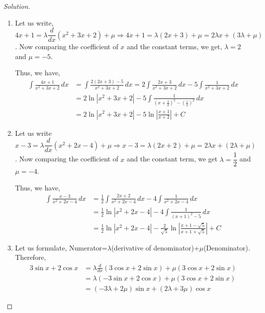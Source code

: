 \documentclass{book}
\theoremstyle{definition}
\newenvironment{solution}
    {\begin{proof}[Solution]}
    {\end{proof}}
\begin{document}
\begin{solution}
\begin{enumerate}[label=(\roman*)]
\item Let us write, $4x+1=\lambda \dfrac{d}{dx}(x^2+3x+2)+\mu \Rightarrow 4x+1=\lambda(2x+3)+\mu=2\lambda x+(3\lambda+\mu)$. Now comparing the coefficient of $x$ and the constant terms, we get, $\lambda=2$ and $\mu=-5$.

Thus, we have,
\begin{align*}
\int\frac{4x+1}{x^2+3x+2}\,dx &= \int\frac{2(2x+3)-5}{x^2+3x+2}\,dx = 2\int\frac{2x+3}{x^2+3x+2}\,dx-5\int\frac{1}{x^2+3x+2}\,dx \\
&= 2\ln|x^2+3x+2|-5\int\frac{1}{(x+\frac{3}{2})^2-(\frac{1}{2})^2}\,dx \\
&= 2\ln|x^2+3x+2|-5\ln\left|\frac{x+1}{x+2}\right|+C
\end{align*}

\item Let us write $x-3=\lambda \dfrac{d}{dx}(x^2+2x-4)+\mu \Rightarrow x-3=\lambda(2x+2)+\mu = 2\lambda x+(2\lambda +\mu)$. 
\newline
Now comparing the coefficient of $x$ and the constant term, we get $\lambda =\dfrac{1}{2}$ and $\mu=-4$.

Thus, we have,
\begin{align*}
\int\frac{x-3}{x^2+2x-4}\,dx &= \frac{1}{2}\int\frac{2x+2}{x^2+2x-4}\,dx-4\int \frac{1}{x^2+2x-4}\,dx \\
&= \frac{1}{2}\ln|x^2+2x-4|-4\int\frac{1}{(x+1)^2-5}\,dx \\
&= \frac{1}{2}\ln|x^2+2x-4|-\frac{2}{\sqrt{5}}\ln\left|\frac{x+1-\sqrt{5}}{x+1+\sqrt{5}}\right|+C
\end{align*}


\item Let us formulate, Numerator=$\lambda$(derivative of denominator)+$\mu$(Denominator). Therefore,
\begin{align*}
    3\sin x+2\cos x &= \lambda \frac{d}{dx}(3\cos x+2\sin x)+\mu(3\cos x+2\sin x) \\
    &= \lambda(-3\sin x+2\cos x)+\mu(3\cos x+2\sin x) \\ 
    &= (-3\lambda+2\mu)\sin x+(2\lambda+3\mu)\cos x
\end{align*}


\end{enumerate}
\end{solution}
\end{document}
